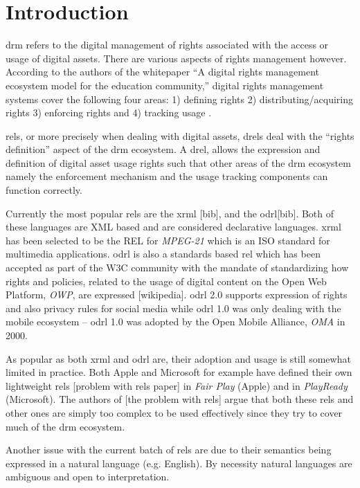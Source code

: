 \chapter{Introduction}
\ac{drm} refers to the digital management of rights associated with the access or usage of digital assets. There are various aspects of rights management however. According to the authors of the whitepaper ``A digital rights management ecosystem model for the education community,'' digital rights management systems cover the following four areas: 1) defining rights 2) distributing/acquiring rights 3) enforcing rights and 4) tracking usage \cite{collier}. 

\ac{rel}s, or more precisely when dealing with digital assets, \ac{drel}s deal with the ``rights definition'' aspect of the \ac{drm} ecosystem. A \ac{drel}, allows the expression and definition of digital asset usage rights such that other areas of the \ac{drm} ecosystem namely the enforcement mechanism and the usage tracking components can function correctly.

Currently the most popular \ac{rel}s are the \ac{xrml} [bib], and the \ac{odrl}[bib]. Both of these languages are XML based and are considered declarative languages. \ac{xrml} has been selected to be the REL for \emph{MPEG-21} which is an ISO standard for multimedia applications. \ac{odrl} is also a standards based \ac{rel} which has been accepted as part of the W3C community with the mandate of standardizing how rights and policies, related to the usage of digital content on the Open Web Platform, \emph{OWP}, are expressed [wikipedia]. \ac{odrl} 2.0 supports expression of rights and also privacy rules for social media while \ac{odrl} 1.0 was only dealing with the mobile ecosystem -- \ac{odrl} 1.0 was adopted by the Open Mobile Alliance, \emph{OMA} in 2000.

As popular as both \ac{xrml} and \ac{odrl} are, their adoption and usage is still somewhat limited in practice. Both Apple and Microsoft for example have defined their own lightweight \ac{rel}s [problem with \ac{rel}s paper] in \emph{Fair Play} (Apple) and in \emph{PlayReady} (Microsoft). The authors of [the problem with \ac{rel}s] argue that both these \ac{rel}s and other ones are simply too complex to be used effectively since they try to cover much of the \ac{drm} ecosystem. 

Another issue with the current batch of \ac{rel}s are due to their semantics being expressed in a natural language (e.g. English). By necessity natural languages are ambiguous and open to interpretation. 

